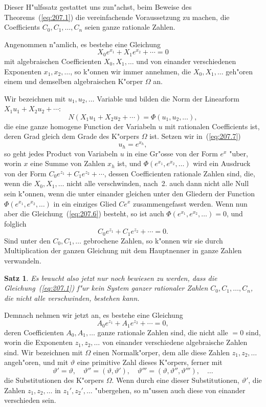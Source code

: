 \documentclass[10pt,a4paper]{article}
\theoremstyle{weberstyle}
\newtheorem{satz}{Satz}[section]
\begin{document}
Dieser H"ulfssatz gestattet uns zun"achst, beim Beweise des
Theorems~(\ref{eq:207.1}) die vereinfachende Voraussetzung zu machen, die
Coefficients $C_0,C_1,\dots,C_n$ seien ganze rationale Zahlen.

Angenommen n"amlich, es bestehe eine Gleichung
\begin{equation}\label{eq:207.6}
X_0e^{x_1} + X_1e^{x_2} + \cdots = 0
\end{equation}
mit algebraischen Coefficienten $X_0,X_1,\dots$ und von einander
verschiedenen Exponenten $x_1,x_2,\dots$, so k"onnen wir immer annehmen,
die $X_0,X_1,\dots$ geh"oren einem und demselben algebraischen K"orper
$\Omega$ an.

Wir bezeichnen mit $u_1,u_2,\dots$ Variable und bilden die Norm der
Linearform $X_1u_1+X_2u_2+\cdots$:
\begin{equation}\label{eq:207.7}
N(X_1u_1+X_2u_2+\cdots) =
\Phi(u_1,u_2,\dots),
\end{equation}
die eine ganze homogene Function der Variabeln $u$ mit rationalen
Coefficients ist, deren Grad gleich dem Grade des K"orpers $\Omega$ ist.
Setzen wir in~(\ref{eq:207.7})
\[
u_h = e^{x_h},
\]
so geht jedes Product von Variabeln $u$ in eine Gr"osse von der Form
$e^x$ "uber, worin $x$ eine Summe von Zahlen $x_h$ ist, und
$\Phi(e^{x_1},e^{x_2},\dots)$ wird ein Ausdruck von der Form
$C_0e^{z_1}+C_1e^{z_2}+\cdots$, dessen Coefficienten rationale Zahlen sind,
die, wenn die $X_0,X_1,\dots$ nicht alle verschwinden, nach~2. auch dann
nicht alle Null sein k"onnen, wenn die unter einander gleichen unter den
Gliedern der Function $\Phi(e^{x_1},e^{x_2},\dots)$ in ein einziges Glied
$C e^x$ zusammengefasst werden. Wenn nun aber die Gleichung~(\ref{eq:207.6})
besteht, so ist auch $\Phi(e^{x_1},e^{x_2},\dots)=0$, und folglich
\[
C_0e^{z_1} + C_1e^{z_2} + \cdots = 0.
\]
Sind unter den $C_0,C_1,\dots$ gebrochene Zahlen, so k"onnen wir sie
durch Multiplication der ganzen Gleichung mit dem Hauptnenner in ganze
Zahlen verwandeln.

\begin{satz}
Es braucht also jetzt nur noch bewiesen zu werden, dass die
Gleichung~(\ref{eq:207.1}) f"ur kein System ganzer rationaler Zahlen
$C_0,C_1,\dots,C_n$, die nicht alle verschwinden, bestehen kann.
\end{satz}

Demnach nehmen wir jetzt an, es bestehe eine Gleichung
\begin{equation}\label{eq:207.8}
A_0e^{z_1} + A_1e^{z_2} + \cdots = 0,
\end{equation}
deren Coefficienten $A_0,A_1,\dots$ ganze rationale Zahlen sind, die nicht
alle $=0$ sind, worin die Exponenten $z_1,z_2,\dots$ von einander
verschiedene algebraische Zahlen sind. Wir bezeichnen mit $\Omega$ einen
Normalk"orper, dem alle diese Zahlen $z_1,z_2,\dots$ angeh"oren, und mit
$\vartheta$ eine primitive Zahl dieses K"orpers, ferner mit
\[
\vartheta'=\vartheta,\quad \vartheta''=(\vartheta,\vartheta'),\quad
\vartheta'''=(\vartheta,\vartheta'',\vartheta'''),\quad\dots
\]
die Substitutionen des K"orpers $\Omega$. Wenn durch eine dieser
Substitutionen, $\vartheta'$, die Zahlen $z_1,z_2,\dots$ in
$z_1',z_2',\dots$ "ubergehen, so m"ussen auch diese von einander
verschieden sein.
\end{document}
